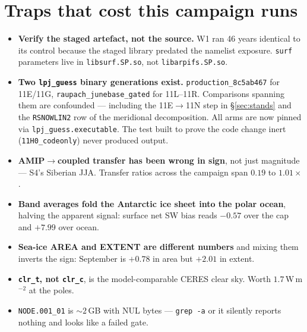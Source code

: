 \documentclass[10pt]{article}
\begin{document}
\section{Traps that cost this campaign runs}\label{sec:traps}
\begin{itemize}\itemsep1pt
\item \textbf{Verify the staged artefact, not the source.} W1 ran 46 years identical to
its control because the staged library predated the namelist exposure. \texttt{surf}
parameters live in \texttt{libsurf.SP.so}, not \texttt{libarpifs.SP.so}.
\item \textbf{Two \texttt{lpj\_guess} binary generations exist.}
\texttt{production\_8c5ab467} for 11E/11G, \texttt{raupach\_junebase\_gated} for 11L--11R.
Comparisons spanning them are confounded --- including the 11E$\to$11N step in
\S\ref{sec:stands} and the \texttt{RSNOWLIN2} row of the meridional decomposition. All
arms are now pinned via \texttt{lpj\_guess.executable}. The test built to prove the code
change inert (\texttt{11H0\_codeonly}) never produced output.
\item \textbf{AMIP$\to$coupled transfer has been wrong in sign}, not just magnitude ---
S4's Siberian JJA. Transfer ratios across the campaign span $0.19$ to $1.01\times$.
\item \textbf{Band averages fold the Antarctic ice sheet into the polar ocean}, halving the
apparent signal: surface net SW bias reads $-0.57$ over the cap and $+7.99$ over ocean.
\item \textbf{Sea-ice AREA and EXTENT are different numbers} and mixing them inverts the
sign: September is $+0.78$ in area but $+2.01$ in extent.
\item \textbf{\texttt{clr\_t}, not \texttt{clr\_c}}, is the model-comparable CERES clear
sky. Worth $1.7$\,W\,m$^{-2}$ at the poles.
\item \texttt{NODE.001\_01} is ${\sim}2$\,GB with NUL bytes --- \texttt{grep -a} or it
silently reports nothing and looks like a failed gate.
\end{itemize}
\end{document}
